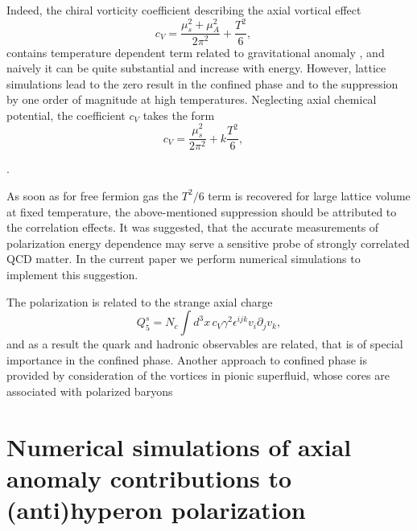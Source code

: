 \documentclass[preprint,aps,showpacs,nofootinbib,superscriptaddress,preprintnumbers,epsf,psf]{revtex4}
\begin{document}
Indeed, the chiral vorticity coefficient describing the axial
vortical effect
\begin{equation}
\label{cv} c_V=\frac{\mu_s^2+\mu_A^2}{2 \pi^2}+\frac{T^2}{6},\quad
\end{equation}
contains temperature dependent term related to gravitational anomaly
\cite{Landsteiner:2011iq}, and naively it can be quite substantial
and increase with energy. However, lattice simulations
\cite{Braguta:2016pwq} lead to the zero result in the confined phase
and to the suppression by one order of magnitude at high
temperatures. Neglecting axial chemical potential, the coefficient
$c_V$ takes the form
\begin{equation}
\label{cvl} c_V=\frac{\mu_s^2}{2 \pi^2}+k \frac{T^2}{6},\quad
\end{equation}

. 


As soon as for free fermion gas the $T^2/6$ term is recovered
\cite{Buividovich:2013jba} for large lattice volume at fixed
temperature, the above-mentioned suppression should be attributed to
the correlation effects. It was suggested\cite{Sorin:2016smp}, that
the accurate measurements of polarization energy dependence may
serve a sensitive probe of strongly correlated QCD matter. In the
current paper we perform numerical simulations to implement this
suggestion.

The polarization is related \cite{Baznat:2013zx,Sorin:2016smp}  to the strange axial charge 
\begin{equation}
\label{q5} 
Q_5^s=N_c \int d^3 x \,c_V \gamma^2 \epsilon^{i j k}v_{i}
\partial_{j}v_ k,
\end{equation}
and as a result the quark and hadronic observables are related, that is of special importance in the confined phase. Another approach to confined phase is provided by consideration \cite{Teryaev:2017nro}
of the vortices in pionic superfluid, whose cores are associated with polarized baryons

\section{Numerical simulations of axial anomaly contributions to (anti)hyperon polarization}
\end{document}
